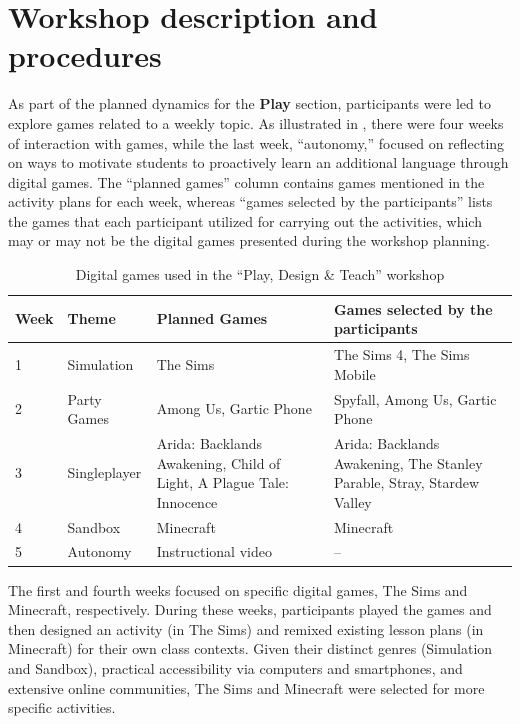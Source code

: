 \documentclass[english]{textolivre}
\begin{document}
\section{Workshop description and procedures}\label{sec-conduta}
As part of the planned dynamics for the \textbf{Play} section, participants were led to explore games related to a weekly topic. As illustrated in , there were four weeks of interaction with games, while the last week, “autonomy,” focused on reflecting on ways to motivate students to proactively learn an additional language through digital games. The “planned games” column contains games mentioned in the activity plans for each week, whereas “games selected by the participants” lists the games that each participant utilized for carrying out the activities, which may or may not be the digital games presented during the workshop planning.

\begin{table}[h!]
\begin{threeparttable}
\caption{Digital games used in the “Play, Design \& Teach” workshop}
\label{tab2}
\centering
\small
\begin{tabular}{p{1cm}p{2.5cm}p{5cm}p{5cm}}
\hline
Week & Theme & Planned Games & Games selected by the participants \\
\hline

1 & Simulation &
The Sims &
The Sims 4, The Sims Mobile \\

2 & Party Games &
Among Us, Gartic Phone &
Spyfall, Among Us, Gartic Phone \\

3 & Singleplayer &
Arida: Backlands Awakening, Child of Light, A Plague Tale: Innocence &
Arida: Backlands Awakening, The Stanley Parable, Stray, Stardew Valley \\

4 & Sandbox &
Minecraft &
Minecraft \\

5 & Autonomy &
Instructional video &
-- \\
\hline
\end{tabular}

\vspace{0.3cm}

\footnotesize
{}
\end{threeparttable}
\end{table}

The first and fourth weeks focused on specific digital games, The Sims and Minecraft, respectively. During these weeks, participants played the games and then designed an activity (in The Sims) and remixed existing lesson plans (in Minecraft) for their own class contexts. Given their distinct genres (Simulation and Sandbox), practical accessibility via computers and smartphones, and extensive online communities, The Sims and Minecraft were selected for more specific activities.
\end{document}
